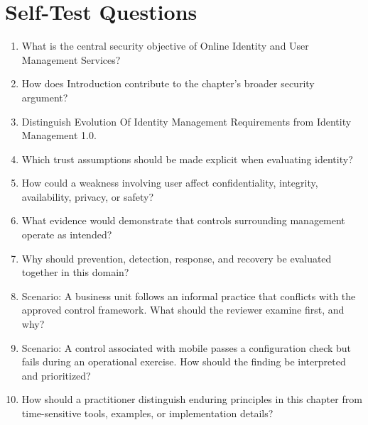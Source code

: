 \documentclass[11pt]{article}
\begin{document}
\section*{Self-Test Questions}
\begin{enumerate}
\item What is the central security objective of Online Identity and User Management Services?
\item How does Introduction contribute to the chapter's broader security argument?
\item Distinguish Evolution Of Identity Management Requirements from Identity Management 1.0.
\item Which trust assumptions should be made explicit when evaluating identity?
\item How could a weakness involving user affect confidentiality, integrity, availability, privacy, or safety?
\item What evidence would demonstrate that controls surrounding management operate as intended?
\item Why should prevention, detection, response, and recovery be evaluated together in this domain?
\item Scenario: A business unit follows an informal practice that conflicts with the approved control framework. What should the reviewer examine first, and why?
\item Scenario: A control associated with mobile passes a configuration check but fails during an operational exercise. How should the finding be interpreted and prioritized?
\item How should a practitioner distinguish enduring principles in this chapter from time-sensitive tools, examples, or implementation details?
\end{enumerate}
\end{document}
